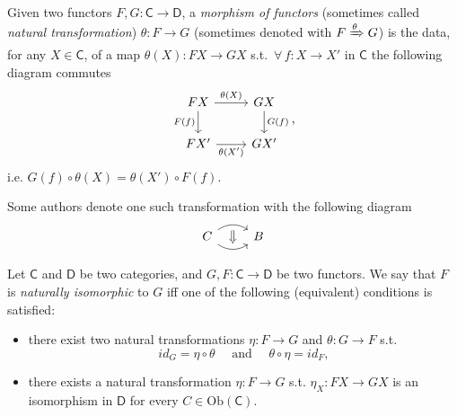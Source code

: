 \begin{defn}
	Given two functors $F,G\colon \mathsf{C} \to \mathsf{D}$, a {\em morphism of functors} (sometimes called {\em natural transformation}) $\theta\colon F \to G$ (sometimes denoted with $F \xRightarrow{\theta} G$) 
	is the data, for any $X \in \mathsf{C}$, of a map $\theta(X)\colon FX \to GX$ s.t. $\,\forall\, f\colon X \to X'$ in $\mathsf{C}$ the following diagram commutes
	\begin{equation}
	\begin{tikzcd}
		FX \arrow[r, "{\theta(X)}", rightarrow] \arrow[d, "{F(f)}"', rightarrow] & GX \arrow[d, "{G(f)}", rightarrow] \\
		FX' \arrow[r, "{\theta(X')}"', rightarrow] & GX'
	\end{tikzcd}
	,\end{equation} 
	i.e. $G(f) \circ \theta(X) = \theta(X') \circ F(f)$.

	Some authors denote one such transformation with the following diagram
	\begin{equation}
	\begin{tikzcd}[row sep=tiny]
		C \arrow[r, ""{name=U, below}, rightarrow, bend left=35] 
		\arrow[r, ""{name=D}, rightarrow, bend right=35] &
		B
		\arrow[Rightarrow, from=U, to=D] 
	\end{tikzcd}
	\end{equation} 
\end{defn}

\begin{defn}
	Let $\mathsf{C}$ and $\mathsf{D}$ be two categories, and $G,F\colon \mathsf{C} \to \mathsf{D}$ be two functors.
	We say that $F$ is {\em naturally isomorphic} to $G$ iff one of the following (equivalent) conditions is satisfied:
	\begin{itemize}
		\item there exist two natural transformations $\eta\colon F \to G$ and $\theta\colon G \to F$ s.t.
			\begin{equation}
			id_G = \eta \circ \theta \quad \text{ and } \quad \theta \circ \eta = id_F
			,\end{equation} 
		\item there exists a natural transformation $\eta\colon F \to G$ s.t. $\eta_X\colon FX \to GX$ is an isomorphism in $\mathsf{D}$ for every $C \in \mathrm{Ob} \left(\mathsf{C}\right)$.
	\end{itemize}
\end{defn}

